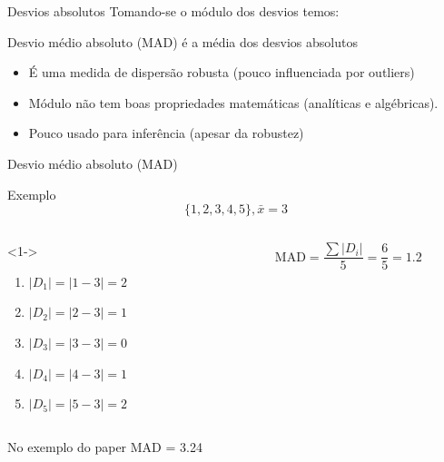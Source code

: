 \documentclass{beamer}
\begin{document}
\begin{frame}{Desvios absolutos}
  Tomando-se o módulo dos desvios temos:

  \begin{definition}
    Desvio médio absoluto (MAD) é a média dos desvios absolutos
  \end{definition}

  \begin{itemize}
  \item É uma medida de dispersão robusta (pouco influenciada por
    outliers)
  \item Módulo não tem boas propriedades matemáticas (analíticas e
    algébricas).
  \item Pouco usado para inferência (apesar da robustez)
  \end{itemize}
\end{frame}

\begin{frame}{Desvio médio absoluto (MAD)}
  \begin{exampleblock}{Exemplo}
  \begin{displaymath}
    \{1,2,3,4,5\}, \bar{x} = 3
  \end{displaymath}
  \begin{columns}
    \begin{column}{5cm}<1->
      \begin{enumerate}
      \item $|D_1| = |1-3| = 2$
      \item $|D_2| = |2-3| = 1$
      \item $|D_3| = |3-3| = 0$
      \item $|D_4| = |4-3| = 1$
      \item $|D_5| = |5-3| = 2$
      \end{enumerate}
    \end{column}
    \begin{column}{5cm}
      \begin{displaymath}
        \mathrm{MAD } = \frac{\sum |D_i|}{5} = \frac{6}{5} = 1.2
      \end{displaymath}
    \end{column}
  \end{columns}
\end{exampleblock}
\begin{block}{No exemplo do paper}
  MAD = 3.24
\end{block}
\end{frame}
\end{document}
